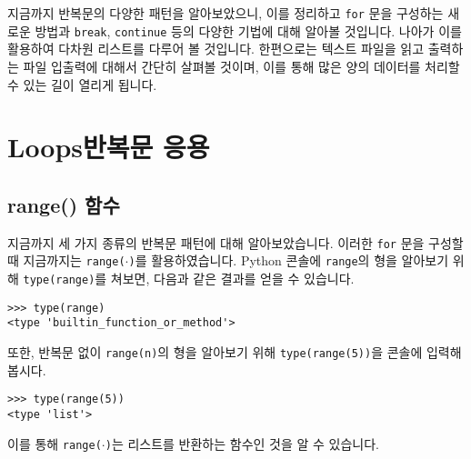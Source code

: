 \documentclass[../main.tex]{subfiles}
\begin{document}
지금까지 반복문의 다양한 패턴을 알아보았으니, 이를 정리하고 \texttt{for} 문을 구성하는 새로운 방법과 \texttt{break}, \texttt{continue} 등의 다양한 기법에 대해 알아볼 것입니다.
나아가 이를 활용하여 다차원 리스트를 다루어 볼 것입니다.
한편으로는 텍스트 파일을 읽고 출력하는 파일 입출력에 대해서 간단히 살펴볼 것이며, 이를 통해 많은 양의 데이터를 처리할 수 있는 길이 열리게 됩니다.

\section{Loops반복문 응용}
\subsection{range() 함수}
지금까지 세 가지 종류의 반복문 패턴에 대해 알아보았습니다.
이러한 \texttt{for} 문을 구성할 때 지금까지는 \texttt{range($\cdot$)}를 활용하였습니다.
Python 콘솔에 \texttt{range}의 형을 알아보기 위해 \texttt{type(range)}를 쳐보면, 다음과 같은 결과를 얻을 수 있습니다.
\begin{verbatim}
>>> type(range)
<type 'builtin_function_or_method'>
\end{verbatim}
또한, 반복문 없이 \texttt{range(n)}의 형을 알아보기 위해 \texttt{type(range(5))}을 콘솔에 입력해봅시다.
\begin{verbatim}
>>> type(range(5))
<type 'list'>
\end{verbatim}
이를 통해 \texttt{range($\cdot$)}는 리스트를 반환하는 함수인 것을 알 수 있습니다.
\end{document}
